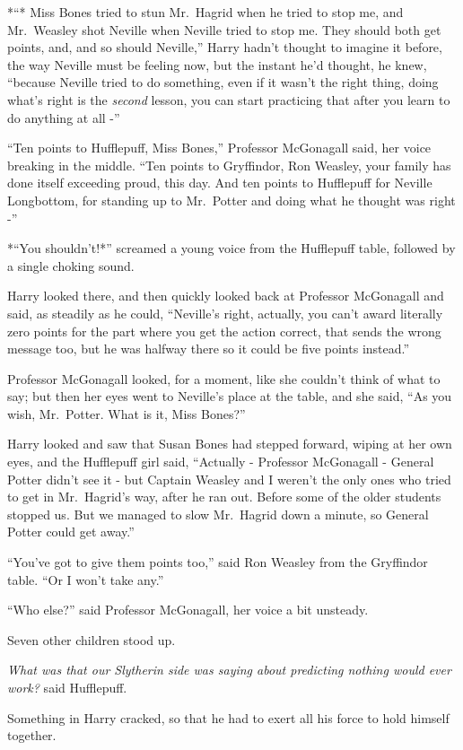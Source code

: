 *``* Miss Bones tried to stun Mr.~Hagrid when he tried to stop me, and
Mr.~Weasley shot Neville when Neville tried to stop me. They should both
get points, and, and so should Neville,'' Harry hadn't thought to
imagine it before, the way Neville must be feeling now, but the instant
he'd thought, he knew, ``because Neville tried to do something, even if
it wasn't the right thing, doing what's right is the \emph{second}
lesson, you can start practicing that after you learn to do anything at
all -''

``Ten points to Hufflepuff, Miss Bones,'' Professor McGonagall said, her
voice breaking in the middle. ``Ten points to Gryffindor, Ron Weasley,
your family has done itself exceeding proud, this day. And ten points to
Hufflepuff for Neville Longbottom, for standing up to Mr.~Potter and
doing what he thought was right -''

*``You shouldn't!*'' screamed a young voice from the Hufflepuff table,
followed by a single choking sound.

Harry looked there, and then quickly looked back at Professor McGonagall
and said, as steadily as he could, ``Neville's right, actually, you
can't award literally zero points for the part where you get the action
correct, that sends the wrong message too, but he was halfway there so
it could be five points instead.''

Professor McGonagall looked, for a moment, like she couldn't think of
what to say; but then her eyes went to Neville's place at the table, and
she said, ``As you wish, Mr.~Potter. What is it, Miss Bones?''

Harry looked and saw that Susan Bones had stepped forward, wiping at her
own eyes, and the Hufflepuff girl said, ``Actually - Professor
McGonagall - General Potter didn't see it - but Captain Weasley and I
weren't the only ones who tried to get in Mr.~Hagrid's way, after he ran
out. Before some of the older students stopped us. But we managed to
slow Mr.~Hagrid down a minute, so General Potter could get away.''

``You've got to give them points too,'' said Ron Weasley from the
Gryffindor table. ``Or I won't take any.''

``Who else?'' said Professor McGonagall, her voice a bit unsteady.

Seven other children stood up.

\emph{What was that our Slytherin side was saying about predicting
nothing would ever work?} said Hufflepuff.

Something in Harry cracked, so that he had to exert all his force to
hold himself together.

